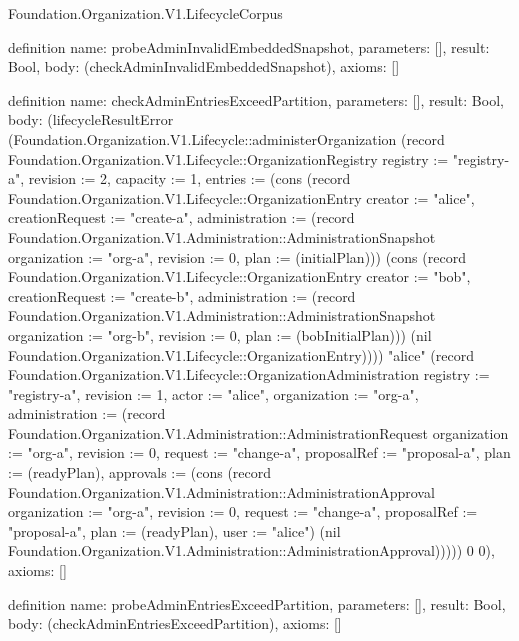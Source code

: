 \begin{lexlean}{Foundation.Organization.V1.LifecycleCorpus}
\begin{semanticmodule}
definition{
  name: probeAdminInvalidEmbeddedSnapshot,
  parameters: [],
  result: Bool,
  body: (checkAdminInvalidEmbeddedSnapshot),
  axioms: []
}

definition{
  name: checkAdminEntriesExceedPartition,
  parameters: [],
  result: Bool,
  body: (lifecycleResultError (Foundation.Organization.V1.Lifecycle::administerOrganization (record Foundation.Organization.V1.Lifecycle::OrganizationRegistry {registry := "registry-a", revision := 2, capacity := 1, entries := (cons (record Foundation.Organization.V1.Lifecycle::OrganizationEntry {creator := "alice", creationRequest := "create-a", administration := (record Foundation.Organization.V1.Administration::AdministrationSnapshot {organization := "org-a", revision := 0, plan := (initialPlan)})}) (cons (record Foundation.Organization.V1.Lifecycle::OrganizationEntry {creator := "bob", creationRequest := "create-b", administration := (record Foundation.Organization.V1.Administration::AdministrationSnapshot {organization := "org-b", revision := 0, plan := (bobInitialPlan)})}) (nil Foundation.Organization.V1.Lifecycle::OrganizationEntry)))}) "alice" (record Foundation.Organization.V1.Lifecycle::OrganizationAdministration {registry := "registry-a", revision := 1, actor := "alice", organization := "org-a", administration := (record Foundation.Organization.V1.Administration::AdministrationRequest {organization := "org-a", revision := 0, request := "change-a", proposalRef := "proposal-a", plan := (readyPlan), approvals := (cons (record Foundation.Organization.V1.Administration::AdministrationApproval {organization := "org-a", revision := 0, request := "change-a", proposalRef := "proposal-a", plan := (readyPlan), user := "alice"}) (nil Foundation.Organization.V1.Administration::AdministrationApproval))})})) 0 0),
  axioms: []
}

definition{
  name: probeAdminEntriesExceedPartition,
  parameters: [],
  result: Bool,
  body: (checkAdminEntriesExceedPartition),
  axioms: []
}


\end{semanticmodule}
\end{lexlean}
